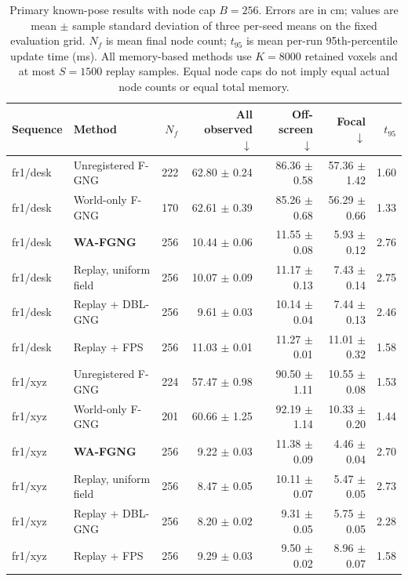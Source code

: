 \begin{table}[t]
\centering
\caption{Primary known-pose results with node cap $B=256$. Errors are in cm; values are mean $\pm$ sample standard deviation of three per-seed means on the fixed evaluation grid. $N_f$ is mean final node count; $t_{95}$ is mean per-run 95th-percentile update time (ms). All memory-based methods use $K=8000$ retained voxels and at most $S=1500$ replay samples. Equal node caps do not imply equal actual node counts or equal total memory.}
\label{tab:main}
\small
\setlength{\tabcolsep}{5pt}
\begin{tabular}{llrrrrr}
\toprule
Sequence & Method & $N_f$ & All observed $\downarrow$ & Off-screen $\downarrow$ & Focal $\downarrow$ & $t_{95}$ \\
\midrule
fr1/desk & Unregistered F-GNG & 222 & 62.80 $\pm$ 0.24 & 86.36 $\pm$ 0.58 & 57.36 $\pm$ 1.42 & 1.60 \\
fr1/desk & World-only F-GNG & 170 & 62.61 $\pm$ 0.39 & 85.26 $\pm$ 0.68 & 56.29 $\pm$ 0.66 & 1.33 \\
fr1/desk & \textbf{WA-FGNG} & 256 & 10.44 $\pm$ 0.06 & 11.55 $\pm$ 0.08 & 5.93 $\pm$ 0.12 & 2.76 \\
fr1/desk & Replay, uniform field & 256 & 10.07 $\pm$ 0.09 & 11.17 $\pm$ 0.13 & 7.43 $\pm$ 0.14 & 2.75 \\
fr1/desk & Replay + DBL-GNG & 256 & 9.61 $\pm$ 0.03 & 10.14 $\pm$ 0.04 & 7.44 $\pm$ 0.13 & 2.46 \\
fr1/desk & Replay + FPS & 256 & 11.03 $\pm$ 0.01 & 11.27 $\pm$ 0.01 & 11.01 $\pm$ 0.32 & 1.58 \\
\midrule
fr1/xyz & Unregistered F-GNG & 224 & 57.47 $\pm$ 0.98 & 90.50 $\pm$ 1.11 & 10.55 $\pm$ 0.08 & 1.53 \\
fr1/xyz & World-only F-GNG & 201 & 60.66 $\pm$ 1.25 & 92.19 $\pm$ 1.14 & 10.33 $\pm$ 0.20 & 1.44 \\
fr1/xyz & \textbf{WA-FGNG} & 256 & 9.22 $\pm$ 0.03 & 11.38 $\pm$ 0.09 & 4.46 $\pm$ 0.04 & 2.70 \\
fr1/xyz & Replay, uniform field & 256 & 8.47 $\pm$ 0.05 & 10.11 $\pm$ 0.07 & 5.47 $\pm$ 0.05 & 2.73 \\
fr1/xyz & Replay + DBL-GNG & 256 & 8.20 $\pm$ 0.02 & 9.31 $\pm$ 0.05 & 5.75 $\pm$ 0.05 & 2.28 \\
fr1/xyz & Replay + FPS & 256 & 9.29 $\pm$ 0.03 & 9.50 $\pm$ 0.02 & 8.96 $\pm$ 0.07 & 1.58 \\
\bottomrule
\end{tabular}
\end{table}
